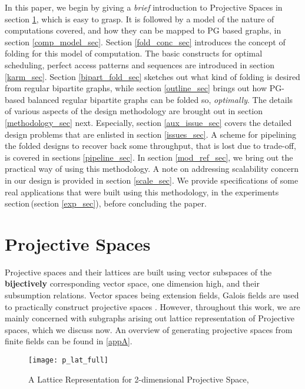 \documentclass[12pt]{article}
\begin{document}
In this paper, we begin by giving a \textit{brief} introduction to
Projective Spaces in section \ref{sec2}, which is easy to grasp. It is
followed by a model of the nature of computations covered, and how they can
be mapped to PG based graphs, in section \ref{comp_model_sec}.  Section
\ref{fold_conc_sec} introduces the concept of folding for this model of
computation. The basic constructs for optimal scheduling, perfect access
patterns and sequences are introduced in section \ref{karm_sec}. Section
\ref{bipart_fold_sec} sketches out what kind of folding is desired from
regular bipartite graphs, while section \ref{outline_sec} brings out how
PG-based balanced regular bipartite graphs can be folded so,
\textit{optimally}. The details of various aspects of the design
methodology are brought out in section \ref{methodology_sec} next.
Especially, section \ref{aux_issue_sec} covers the detailed design problems
that are enlisted in section \ref{issues_sec}.  A scheme for pipelining the
folded designs to recover back some throughput, that is lost due to
trade-off, is covered in sections \ref{pipeline_sec}.  In section
\ref{mod_ref_sec}, we bring out the practical way of using this
methodology.  A note on addressing scalability concern in our design is
provided in section \ref{scale_sec}.  We provide specifications of some
real applications that were built using this methodology, in the
experiments section\,(section \ref{exp_sec}), before concluding the paper.

\section{Projective Spaces}
\label{sec2}

Projective spaces and their lattices are built using vector subspaces of
the \textbf{bijectively} corresponding vector space, one dimension high,
and their subsumption relations. Vector spaces being extension fields,
Galois fields are used to practically construct projective spaces
\cite{expanders}. However, throughout this work, we are mainly concerned
with subgraphs arising out lattice representation of Projective spaces,
which we discuss now. An overview of generating projective spaces from
finite fields can be found in \ref{appA}.

\begin{figure}[h]
\begin{center}
\texttt{[image: p\_lat\_full]}
\end{center}
\caption{A Lattice Representation for 2-dimensional Projective Space,
}
\label{pg_lat}
\end{figure}
\end{document}

